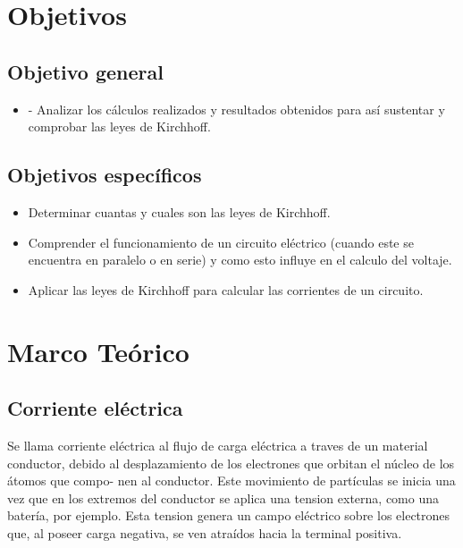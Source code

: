 \documentclass[letterpaper, 12pt]{article}
\begin{document}
\section{Objetivos}

\subsection{Objetivo general}

\begin{itemize}[label=$\triangleright$]
	\item -	Analizar los cálculos realizados y resultados obtenidos para así sustentar y comprobar las leyes de Kirchhoff.
\end{itemize}

\subsection{Objetivos específicos}

\begin{itemize}[label=$\triangleright$]
	\item Determinar cuantas y cuales son las leyes de Kirchhoff.
	\item Comprender el funcionamiento de un circuito eléctrico
	      (cuando este se encuentra en paralelo o en serie) y como
	      esto influye en el calculo del voltaje.
	\item Aplicar las leyes de Kirchhoff para calcular las corrientes
	      de un circuito.
\end{itemize}

\section{Marco Teórico}

\subsection{Corriente eléctrica}

Se llama corriente eléctrica al flujo de carga eléctrica a
traves de un material conductor, debido al desplazamiento
de los electrones que orbitan el núcleo de los átomos que
compo- nen al conductor. Este movimiento de partículas se
inicia una vez que en los extremos del conductor se aplica
una tension externa, como una batería, por ejemplo. Esta
tension genera un campo eléctrico sobre los electrones que,
al poseer carga negativa, se ven atraídos hacia la terminal
positiva.
\end{document}
